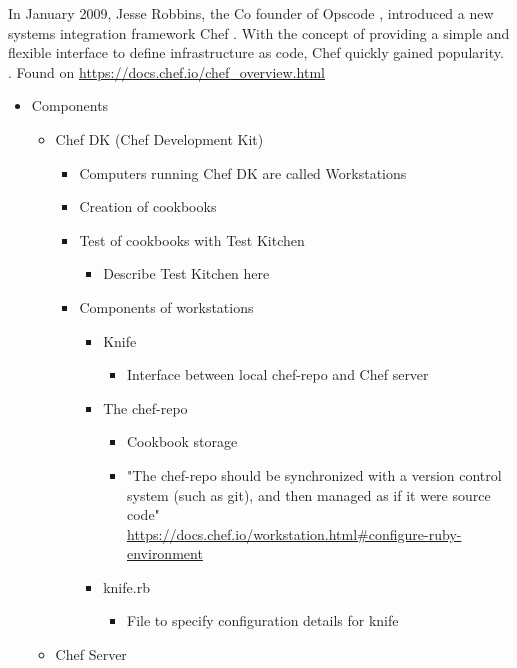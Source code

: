In January 2009, Jesse Robbins, the Co founder of Opscode \cite{mittechreviewrobbins}, introduced a new systems integration framework Chef \cite{chefcomannouncement}. With the concept of providing a simple and flexible interface to define infrastructure as code, Chef quickly gained popularity.  \cite{pandey2012investigating}.
Found on \url{https://docs.chef.io/chef_overview.html}
\begin{itemize}
	\item Components
	\begin{itemize}
		\item Chef DK (Chef Development Kit)
		\begin{itemize}
			\item Computers running Chef DK are called Workstations
			\item Creation of cookbooks
			\item Test of cookbooks with Test Kitchen
			\begin{itemize}
				\item Describe Test Kitchen here
			\end{itemize}
			\item Components of workstations
			\begin{itemize}
				\item Knife
				\begin{itemize}
					\item Interface between local chef-repo and Chef server
				\end{itemize}
				\item The chef-repo
				\begin{itemize}
					\item Cookbook storage
					\item "The chef-repo should be synchronized with a version control system (such as git), and then managed as if it were source code"\\ {\tiny \url{https://docs.chef.io/workstation.html#configure-ruby-environment}}
				\end{itemize}
				\item knife.rb
				\begin{itemize}
					\item File to specify configuration details for knife
				\end{itemize}
			\end{itemize}
		\end{itemize}
		\item Chef Server
		\begin{itemize}

\end{itemize}
\end{itemize}
\end{itemize}
